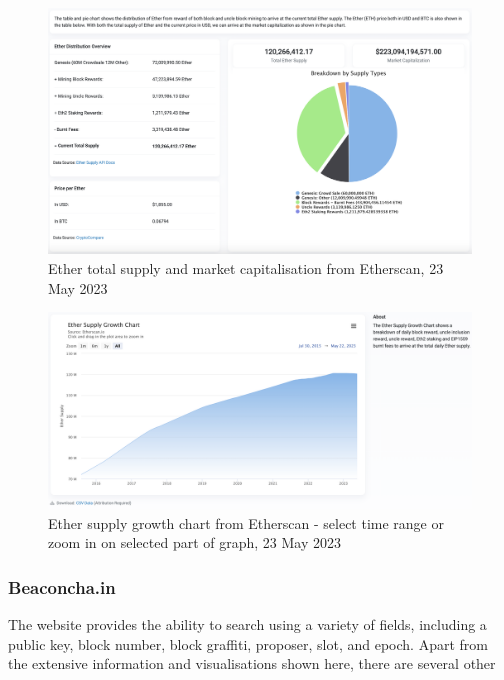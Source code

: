 \documentclass[UTF8]{article}
\begin{document}
\begin{figure}[htbp]
\begin{center}
\includegraphics[width=0.9\linewidth]{images/totcap}
\caption{Ether total supply and market capitalisation from Etherscan, 23 May 2023}
\label{fig:totcap}
\end{center}
\end{figure}

\begin{figure}[htbp]
\begin{center}
\includegraphics[width=0.9\linewidth]{images/ethgrowth}
\caption{Ether supply growth chart from Etherscan - select time range or zoom in on selected part of graph, 23 May 2023}
\label{fig:ethgrowth}
\end{center}
\end{figure}

\clearpage
\subsubsection*{Beaconcha.in}
The website provides the ability to search using a variety of fields, including a public key, block number, block graffiti, proposer, slot, and epoch. Apart from the extensive information and visualisations shown here, there are several other 
\end{document}
